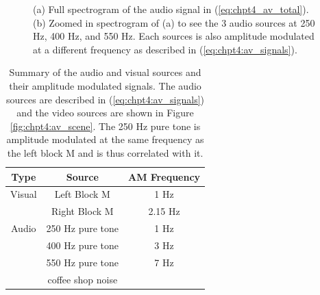 \begin{figure}
  \begin{center}
    \caption{(a) Full spectrogram of the audio signal in (\ref{eq:chpt4_av_total}). (b)
      Zoomed in spectrogram of (a) to see the 3 audio sources at 250 Hz, 400 Hz, and 550
      Hz. Each sources is also amplitude modulated at a different frequency as described
      in (\ref{eq:chpt4:av_signals}).}
    \label{fig:chpt4:av_spectrograms}
  \end{center}
\end{figure}


\begin{table}[ht!]
\centering
\begin{tabular}{c|c|c}\toprule
Type & Source & AM Frequency\\
\midrule
Visual & Left Block M & 1 Hz\\
& Right Block M & 2.15 Hz\\
\midrule
Audio & 250 Hz pure tone & 1 Hz\\
& 400 Hz pure tone & 3 Hz\\
& 550 Hz pure tone & 7 Hz\\
& coffee shop noise &\\
\bottomrule
\end{tabular}
\caption{Summary of the audio and visual sources and their amplitude modulated
  signals. The audio sources are described in (\ref{eq:chpt4:av_signals}) and the video
  sources are shown in Figure \ref{fig:chpt4:av_scene}. The 250 Hz pure tone is amplitude
  modulated at the same frequency as the left block M and is thus correlated with it.}
\label{tab:av_descrp}
\end{table}



